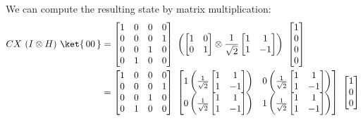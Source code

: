 \documentclass{article}
\theoremstyle{definition}
\newcommand{\kz}[1]{\ket{\,#1\,}}
\begin{document}
We can compute the resulting state by matrix multiplication:
\begin{align}
	CX \ (I \otimes H) \ \kz{00} &= \begin{bmatrix}
		1 & 0 & 0 & 0\\
		0 & 0 & 0 & 1\\
		0 & 0 & 1 & 0\\
		0 & 1 & 0 & 0
	\end{bmatrix} \ \left(\begin{bmatrix}
		1 & 0\\
		0 & 1
	\end{bmatrix} \otimes \frac{1}{\sqrt{2}}\begin{bmatrix}
		1 & 1\\
		1 & -1
	\end{bmatrix}\right) \ \begin{bmatrix}
		1\\
		0\\
		0\\
		0
	\end{bmatrix}\\
	&= \begin{bmatrix}
		1 & 0 & 0 & 0\\
		0 & 0 & 0 & 1\\
		0 & 0 & 1 & 0\\
		0 & 1 & 0 & 0
	\end{bmatrix} \ \begin{bmatrix}
		1\left(\frac{1}{\sqrt{2}}\begin{bmatrix}
			1 & 1\\
			1 & -1
		\end{bmatrix}\right) & 0\left(\frac{1}{\sqrt{2}}\begin{bmatrix}
			1 & 1\\
			1 & -1
		\end{bmatrix}\right)\\
		0\left(\frac{1}{\sqrt{2}}\begin{bmatrix}
			1 & 1\\
			1 & -1
		\end{bmatrix}\right) & 1\left(\frac{1}{\sqrt{2}}\begin{bmatrix}
			1 & 1\\
			1 & -1
		\end{bmatrix}\right)
	\end{bmatrix} \ \begin{bmatrix}
		1\\
		0\\
		0\\

\end{bmatrix}
\end{align}
\end{document}
